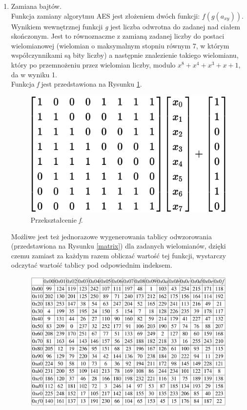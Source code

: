 \begin{enumerate}
	\item Zamiana bajtów. \\
			Funkcja zamiany algorytmu AES jest złożeniem dwóch funkcji: $f(g(a_{xy})).$ \\
			Wynikiem wewnętrznej funkcji \textit{g} jest liczba odwrotna do zadanej nad ciałem skończonym.
			Jest to równoznaczne z zamianą zadanej liczby do postaci wielomianowej (wielomian o maksymalnym 
			stopniu równym 7, w którym współczynnikami są bity liczby) a następnie znalezienie takiego
			wielomianu, który po przemnożeniu przez wielomian liczby, modulo $x^8+x^4+x^3+x+1$, da w wyniku 1. \\
			Funkcja \textit{f} jest przedstawiona na Rysunku \ref{ff}.  \\
			\begin{figure}[t]
			    \centering
			    \includegraphics[scale=0.5]{content/images/affin}
				\caption{Przekształcenie \textit{f}.}
				\label{ff}
			\end{figure}
			Możliwe jest też jednorazowe wygenerowania tablicy odwzorowania (przedstawiona na Rysunku \ref{matrix}) dla zadanych wielomianów,
			dzięki czemu zamiast za każdym razem obliczać wartość tej funkcji, wystarczy odczytać wartość tablicy
			pod odpowiednim indeksem. 
			\begin{figure}[t]
			    \centering
			    \includegraphics[width=\textwidth]{content/images/sbox}

\end{figure}
\end{enumerate}
